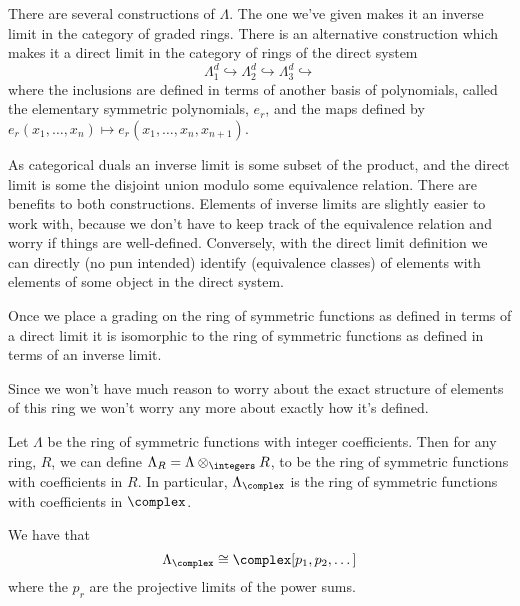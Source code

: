 \begin{remark}{}{}
    There are several constructions of \(\Lambda\).
    The one we've given makes it an inverse limit in the category of graded rings.
    There is an alternative construction which makes it a direct limit in the category of rings of the direct system
    \begin{equation}
        \Lambda_1^d \hookrightarrow \Lambda_2^d \hookrightarrow \Lambda_3^d \hookrightarrow
    \end{equation}
    where the inclusions are defined in terms of another basis of polynomials, called the elementary symmetric polynomials, \(e_r\), and the maps defined by \(e_r(x_1, \dotsc, x_n) \mapsto e_r(x_1, \dotsc, x_n, x_{n+1})\).
    
    As categorical duals an inverse limit is some subset of the product, and the direct limit is some the disjoint union modulo some equivalence relation.
    There are benefits to both constructions.
    Elements of inverse limits are slightly easier to work with, because we don't have to keep track of the equivalence relation and worry if things are well-defined.
    Conversely, with the direct limit definition we can directly (no pun intended) identify (equivalence classes) of elements with elements of some object in the direct system.
    
    Once we place a grading on the ring of symmetric functions as defined in terms of a direct limit it is isomorphic to the ring of symmetric functions as defined in terms of an inverse limit.
    
    Since we won't have much reason to worry about the exact structure of elements of this ring we won't worry any more about exactly how it's defined.
\end{remark}

Let \(\Lambda\) be the ring of symmetric functions with integer coefficients.
Then for any ring, \(R\), we can define \(\Lambda_R = \Lambda \otimes_{\integers} R\), to be the ring of symmetric functions with coefficients in \(R\).
In particular, \(\Lambda_{\complex}\) is the ring of symmetric functions with coefficients in \(\complex\).

\begin{prp}{}{}
    We have that
    \begin{equation}
        \Lambda_{\complex} \isomorphic \complex[p_1, p_2, \dotsc]
    \end{equation}
    where the \(p_r\) are the projective limits of the power sums.
\end{prp}

